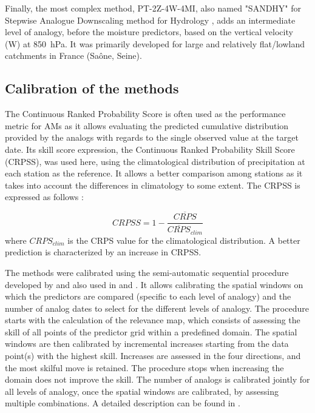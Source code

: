 \documentclass[alpha-refs]{wiley-article}
\begin{document}
Finally, the most complex method, PT-2Z-4W-4MI, also named "SANDHY" for Stepwise Analogue Downscaling method for Hydrology \citep{BenDaoud2016, Caillouet2016}, adds an intermediate level of analogy, before the moisture predictors, based on the vertical velocity (W) at 850~hPa. It was primarily developed for large and relatively flat/lowland catchments in France (Sa\^{o}ne, Seine).


\subsection{Calibration of the methods} %
\label{sec:calibration}

The Continuous Ranked Probability Score \citep[CRPS,][]{Brown1974, Matheson1976, Hersbach2000} is often used as the performance metric for AMs as it allows evaluating the predicted cumulative distribution provided by the analogs with regards to the single observed value at the target date. Its skill score expression, the Continuous Ranked Probability Skill Score (CRPSS), was used here, using the climatological distribution of precipitation at each station as the reference. It allows a better comparison among stations as it takes into account the differences in climatology to some extent. The CRPSS is expressed as follows \citep{Bradley2011}:

\begin{equation}
	\label{eq:CRPSS}
	CRPSS = 1-\frac{\overline{CRPS}}{\overline{CRPS}_{clim}}
\end{equation}
where $CRPS_{clim}$ is the CRPS value for the climatological distribution. A better prediction is characterized by an increase in CRPSS.

The methods were calibrated using the semi-automatic sequential procedure developed by \citet{Bontron2004} and also used in \citet{Radanovics2013} and \citet{BenDaoud2016}. It allows calibrating the spatial windows on which the predictors are compared (specific to each level of analogy) and the number of analog dates to select for the different levels of analogy. The procedure starts with the calculation of the relevance map, which consists of assessing the skill of all points of the predictor grid within a predefined domain. The spatial windows are then calibrated by incremental increases starting from the data point(s) with the highest skill. Increases are assessed in the four directions, and the most skilful move is retained. The procedure stops when increasing the domain does not improve the skill. The number of analogs is calibrated jointly for all levels of analogy, once the spatial windows are calibrated, by assessing multiple combinations. A detailed description can be found in \citet{Horton2019}. 
\end{document}
